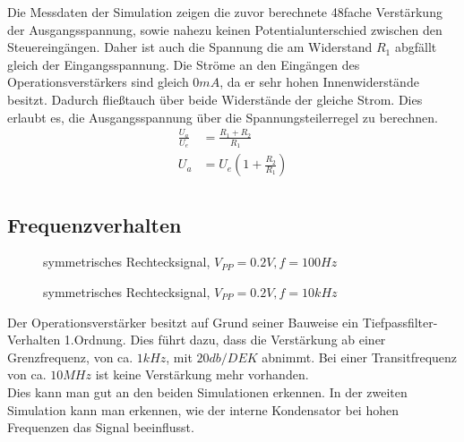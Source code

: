 Die Messdaten der Simulation zeigen die zuvor berechnete 48fache Verstärkung der Ausgangsspannung, sowie nahezu keinen Potentialunterschied zwischen den Steuereingängen.
Daher ist auch die Spannung die am Widerstand $R_1$ abgfällt gleich der Eingangsspannung. Die Ströme an den Eingängen des Operationsverstärkers sind gleich $0mA$, da er 
sehr hohen Innenwiderstände besitzt. Dadurch fließtauch über beide Widerstände der gleiche Strom. Dies erlaubt es, die Ausgangsspannung über die Spannungsteilerregel zu
berechnen.\\

\begin{align*}
 \frac{U_a}{U_e} &= \frac{R_1 + R_2}{R_1}\\
 U_a &= U_e \left( 1+\frac{R_2}{R_1} \right)\\
\end{align*}

\subsection{Frequenzverhalten}

\begin{figure}[H]
  \centering
  \caption{symmetrisches Rechtecksignal, $V_{PP}=0.2V, f=100Hz$}
\end{figure}

\begin{figure}[H]
  \centering
  \caption{symmetrisches Rechtecksignal, $V_{PP}=0.2V, f=10kHz$}
\end{figure}

Der Operationsverstärker besitzt auf Grund seiner Bauweise ein Tiefpassfilter-Verhalten 1.Ordnung. Dies führt dazu, dass die Verstärkung ab einer Grenzfrequenz,
von ca. $1kHz$, mit $20db/DEK$ abnimmt. Bei einer Transitfrequenz von ca. $10MHz$ ist keine Verstärkung mehr vorhanden.\\
Dies kann man gut an den beiden Simulationen erkennen. In der zweiten Simulation kann man erkennen, wie der interne Kondensator bei hohen Frequenzen das Signal 
beeinflusst.\\
